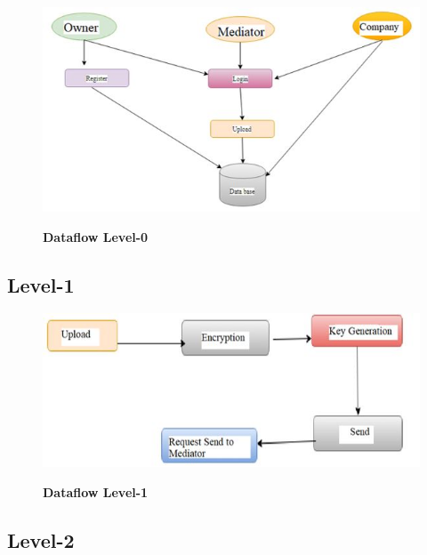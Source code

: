\documentclass[BTech]{srmuthesis}
\begin{document}
\begin{figure}[H]
\centering
\includegraphics[scale=0.8]{level0.jpg}
\label{fig:1}\hspace{10mm}
\caption{\textbf{Dataflow Level-0}}
\end{figure}
\subsection{Level-1}

\begin{figure}[H]
\centering
\includegraphics[scale=0.7]{level1.jpg}
\label{fig:1}\hspace{10mm}
\caption{\textbf{Dataflow Level-1}}
\end{figure}
\subsection{Level-2}
\end{document}
